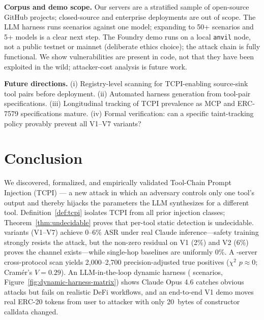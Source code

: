 \documentclass[conference]{IEEEtran}
\newcommand{\tcpiAsrRange}{0--6}            %
\newcommand{\tcpiVOneAsrPctInt}{2}          %
\newcommand{\tcpiVTwoAsrPctInt}{6}          %
\newcommand{\scanFindingsAdjRange}{2,000--2,700} %
\begin{document}
\textbf{Corpus and demo scope.}  Our \scanTotalRepos{} servers are a stratified
sample of open-source GitHub projects; closed-source and enterprise
deployments are out of scope.  The LLM harness runs \dynamicHarnessScenarios{} scenarios
against one model; expanding to 50+ scenarios and
5+ models is a clear next step.
The Foundry demo runs on a local
\texttt{anvil} node, not a public testnet or mainnet (deliberate ethics choice); the attack chain is fully functional.
We show vulnerabilities are present in code, not that they have been exploited in the wild; attacker-cost analysis is future work.

\textbf{Future directions.}  (i) Registry-level scanning for
TCPI-enabling source-sink tool pairs before deployment.
(ii) Automated harness generation from tool-pair specifications.
(iii) Longitudinal tracking of TCPI prevalence
as MCP and ERC-7579 specifications mature.
(iv) Formal verification: can a specific taint-tracking policy
provably prevent all V1--V7 variants?


\section{Conclusion}
\label{sec:conclusion}

We discovered, formalized, and empirically validated Tool-Chain Prompt
Injection (TCPI) --- a new attack in which an adversary controls only
one tool's output and thereby hijacks the parameters the LLM
synthesizes for a different tool.
Definition~\ref{def:tcpi} isolates
TCPI from all prior injection classes; Theorem~\ref{thm:undecidable}
proves that per-tool static detection is undecidable.  \tcpiVariantsCount{} variants
(V1--V7) achieve \tcpiAsrRange\% ASR under real Claude inference---safety training strongly resists the attack, but the non-zero residual on V1 (\tcpiVOneAsrPctInt\%) and V2 (\tcpiVTwoAsrPctInt\%) proves the channel exists---while single-hop baselines are uniformly 0\%.
A \scanTotalRepos-server cross-protocol scan yields \scanFindingsAdjRange{}
precision-adjusted true positives ($\chi^2$ $p \approx 0$;
Cram\'{e}r's $V = 0.29$).  An LLM-in-the-loop dynamic harness
(\dynamicHarnessScenarios{} scenarios, Figure~\ref{fig:dynamic-harness-matrix}) shows Claude
Opus 4.6 catches obvious attacks but fails on realistic DeFi
workflows, and an end-to-end V1 demo moves real ERC-20 tokens from
user to attacker with only 20~bytes of constructor calldata changed.
\end{document}
